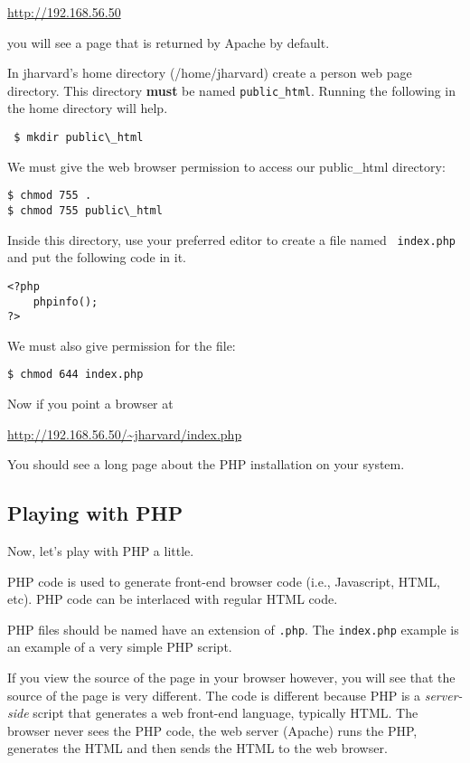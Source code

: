 \documentclass[letterpaper]{article}
\begin{document}
\url{http://192.168.56.50}

you will see a page that is returned by Apache by default.

In jharvard's home directory (/home/jharvard) create a person web page directory.  This directory {\bf
must} be named {\tt public\_html}.  Running the following in the home directory
will help.

\verb+ $ mkdir public\_html +

We must give the web browser permission to access our public\_html directory:

\begin{verbatim}
$ chmod 755 .
$ chmod 755 public\_html
\end{verbatim}

Inside this directory, use your preferred editor to create a file named {\tt
index.php} and put the following code in it.

\begin{verbatim}
<?php
    phpinfo();
?>
\end{verbatim}

We must also give permission for the file:

\begin{verbatim}
$ chmod 644 index.php
\end{verbatim}

Now if you point a browser at

\url{http://192.168.56.50/~jharvard/index.php}

You should see a long page about the PHP installation on your system.

\subsection*{Playing with PHP}

Now, let's play with PHP a little.

PHP code is used to generate front-end browser code (i.e., Javascript, HTML,
etc).   PHP code can be interlaced with regular HTML code.

PHP files should be named have an extension of {\tt .php}.  The {\tt index.php}
example is an example of a very simple PHP script.

If you view the source of the page in your browser however, you will see that
the source of the page is very different.  The code is different because PHP is
a {\it server-side} script that generates a web front-end language, typically HTML.
The browser never sees the PHP code, the web server (Apache) runs the PHP,
generates the HTML and then sends the HTML to the web browser.
\end{document}
